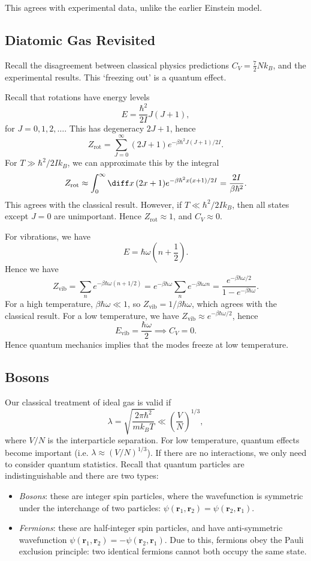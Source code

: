 \documentclass[12pt]{article}
\begin{document}
This agrees with experimental data, unlike the earlier Einstein model.

\subsection{Diatomic Gas Revisited}
\label{sub:dg_rev}

Recall the disagreement between classical physics predictions $C_V = \frac{7}{2} N k_B$, and the experimental results. This `freezing out' is a quantum effect.

Recall that rotations have energy levels
\[
E = \frac{\hbar^2}{2I}J(J+1),
\]
for $J = 0, 1, 2, \ldots$. This has degeneracy $2J + 1$, hence
\[
Z_{\mathrm{rot}} = \sum_{J = 0}^\infty (2J + 1) e^{-\beta \hbar^2 J(J+1)/2I}.
\]
For $T \gg \hbar^2/2Ik_B$, we can approximate this by the integral
\[
Z_{\mathrm{rot}} \approx \int_0^\infty \diff x \, (2x + 1) e^{-\beta \hbar^2 x(x+1) / 2I} = \frac{2I}{\beta \hbar^2}.
\]
This agrees with the classical result. However, if $T \ll \hbar^2/2Ik_B$, then all states except $J = 0$ are unimportant. Hence $Z_{\mathrm{rot}} \approx 1$, and $C_V \approx 0$.

For vibrations, we have
\[
	E = \hbar \omega \left(n + \frac12\right).
\]
Hence we have
\[
Z_{\mathrm{vib}} = \sum_n e^{-\beta \hbar \omega(n+1/2)} = e^{-\beta \hbar \omega} \sum_n e^{-\beta \hbar \omega n} = \frac{e^{-\beta \hbar \omega/2}}{1 - e^{-\beta \hbar \omega}}.
\]
For a high temperature, $\beta \hbar \omega \ll 1$, so $Z_{\mathrm{vib}} = 1/\beta \hbar \omega$, which agrees with the classical result. For a low temperature, we have $Z_{\mathrm{vib}} \approx e^{-\beta \hbar \omega/2}$, hence
\[
E_{\mathrm{vib}} = \frac{\hbar \omega}{2} \implies C_V = 0.
\]
Hence quantum mechanics implies that the modes freeze at low temperature.


\subsection{Bosons}
\label{sub:bos}

Our classical treatment of ideal gas is valid if
\[
	\lambda = \sqrt{\frac{2 \pi \hbar^2}{m k_B T}} \ll \left( \frac{V}{N} \right)^{1/3},
\]
where $V/N$ is the interparticle separation. For low temperature, quantum effects become important (i.e. $\lambda \approx (V/N)^{1/3}$). If there are no interactions, we only need to consider quantum statistics. Recall that quantum particles are indistinguishable and there are two types:
\begin{itemize}
	\item \emph{Bosons}: these are integer spin particles, where the wavefunction is symmetric under the interchange of two particles: $\psi(\mathbf{r}_1, \mathbf{r}_2) = \psi(\mathbf{r}_2, \mathbf{r}_1)$.
	\item \emph{Fermions}: these are half-integer spin particles, and have anti-symmetric wavefunction $\psi(\mathbf{r}_1, \mathbf{r}_2) = - \psi(\mathbf{r}_2, \mathbf{r}_1)$. Due to this, fermions obey the Pauli exclusion principle: two identical fermions cannot both occupy the same state.
\end{itemize}
\end{document}
